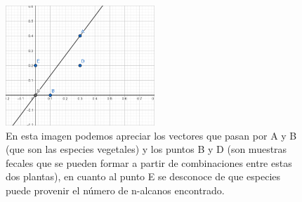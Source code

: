 \documentclass[11pt]{article}
\begin{document}
\begin{figure}[h!] 
\centering
    \includegraphics[width=0.5\textwidth]{ejemplo_practico.png}
\caption{En esta imagen podemos apreciar los vectores que pasan por A y B (que son las especies vegetales) y los puntos B y D (son muestras fecales que se pueden formar a partir de combinaciones entre estas dos plantas), en cuanto al punto E se desconoce de que especies puede provenir el número de n-alcanos encontrado.
}
\label{fig:eje_prac}
\end{figure}



\end{document}
